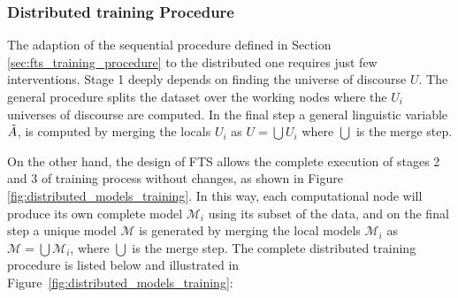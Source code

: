 \subsubsection{Distributed training Procedure}
\label{sec:distributed_training}

The adaption of the sequential procedure defined in Section \ref{sec:fts_training_procedure} to the distributed one requires just few interventions. Stage 1 deeply depends on finding the universe of discourse $U$. The general procedure splits the dataset over the working nodes where the $U_i$ universes of discourse are computed. In the final step a general linguistic variable $\tilde{A}$, is computed by merging the locals $U_i$ as $U = \bigcup U_i$ where $\bigcup$ is the merge step.

On the other hand, the design of FTS allows the complete execution of stages 2 and 3 of training process without changes, as shown in Figure \ref{fig:distributed_models_training}. In this way, each computational node will produce its own complete model  $\mathcal{M}_i$ using its subset of the data, and on the final step a unique model  $\mathcal{M}$ is generated by merging the local models  $\mathcal{M}_i$ as  $\mathcal{M} = \bigcup \mathcal{M}_i$, where $\bigcup$ is the merge step. The complete distributed training procedure is listed below and illustrated in Figure~\ref{fig:distributed_models_training}:

